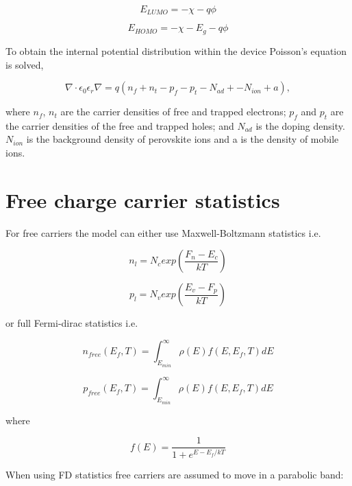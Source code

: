 \begin{equation}
E_{LUMO}=-\chi-q\phi
\end{equation}

\begin{equation}
E_{HOMO}=-\chi-E_g-q\phi
\end{equation}

To obtain the internal potential distribution within the device Poisson's equation is solved,

\begin{equation}
\label{eq:pos}
\nabla \cdot \epsilon_0 \epsilon_r \nabla = q (n_{f}+n_{t}-p_{f}-p_{t}-N_{ad}+-N_{ion}+a),
\end{equation}

where $n_{f}$, $n_{t}$ are the carrier densities of free and trapped electrons; $p_{f}$ and $p_{t}$ are the carrier densities of the free and trapped holes; and $N_{ad}$ is the doping density. $N_{ion}$ is the background density of perovskite ions and a is the density of mobile ions.

\section{Free charge carrier statistics}
For free carriers the model can either use Maxwell-Boltzmann statistics i.e.

\begin{equation}
n_{l}=N_c exp \left (\frac{F_n-E_{c}}{kT} \right)
\end{equation}

\begin{equation}
p_{l}=N_v exp \left(\frac{E_{v}-F_p}{kT} \right)
\end{equation}


or full Fermi-dirac statistics i.e.

\begin{equation}
n_{free}(E_{f},T)=\int^{\infty}_{E_{min}} \rho(E) f(E,E_{f},T) dE
\end{equation}

\begin{equation}
p_{free}(E_{f},T)=\int^{\infty}_{E_{min}} \rho(E) f(E,E_{f},T) dE
\end{equation}

where

\begin{equation}
f(E)=\frac{1}{1+e^{{E-E_f}/kT}}
\end{equation}

When using FD statistics free carriers are assumed to move in a parabolic band:

